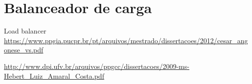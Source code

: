 \part{Balanceador de carga}

Load balancer \url{https://www.ppgia.pucpr.br/pt/arquivos/mestrado/dissertacoes/2012/cesar_angonese_vs.pdf}

\url{http://www.dpi.ufv.br/arquivos/ppgcc/dissertacoes/2009-ms-Hebert_Luiz_Amaral_Costa.pdf}
